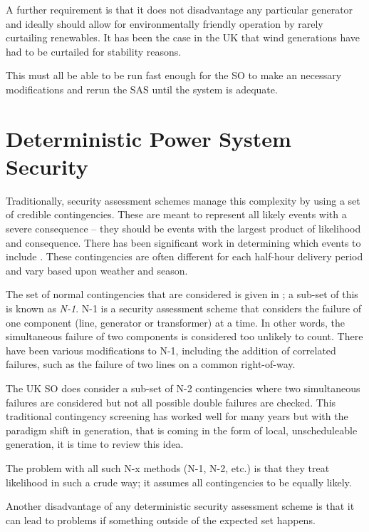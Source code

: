 \documentclass[a4paper,oneside,12pt]{report}
\begin{document}
A further requirement is that it does not disadvantage any particular generator and ideally should allow for environmentally friendly operation by rarely curtailing renewables. It has been the case in the UK that wind generations have had to be curtailed for stability reasons.

This must all be able to be run fast enough for the SO to make an necessary modifications and rerun the SAS until the system is adequate.


\section{Deterministic Power System Security}

Traditionally, security assessment schemes manage this complexity by using a set of credible contingencies. These are meant to represent all likely events with a severe consequence -- they should be events with the largest product of likelihood and consequence. There has been significant work in determining which events to include \cite{Balu1992, McCalley1999, Donde2008}. These contingencies are often different for each half-hour delivery period and vary based upon weather and season.

The set of normal contingencies that are considered is given in \cite{Kundur1994}; a sub-set of this is known as \emph{N-1}. N-1 is a security assessment scheme that considers the failure of one component (line, generator or transformer) at a time. In other words, the simultaneous failure of two components is considered too unlikely to count. There have been various modifications to N-1, including the addition of correlated failures, such as the failure of two lines on a common right-of-way.

The UK SO does consider a sub-set of N-2 contingencies where two simultaneous failures are considered but not all possible double failures are checked. This traditional contingency screening has worked well for many years but with the paradigm shift in generation, that is coming in the form of local, unscheduleable generation, it is time to review this idea.

The problem with all such N-x methods (N-1, N-2, etc.) is that they treat likelihood in such a crude way; it assumes all contingencies to be equally likely.

Another disadvantage of any deterministic security assessment scheme is that it can lead to problems if something outside of the expected set happens.
\end{document}
